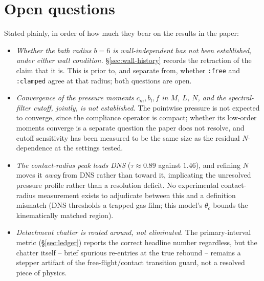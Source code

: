 \section{Open questions}
\label{sec:open}

Stated plainly, in order of how much they bear on the results in the paper:

\begin{itemize}
\item \emph{Whether the bath radius $b=6$ is wall-independent has not been established, under either wall condition.} \S\ref{sec:wall-history} records the retraction of the claim that it is. This is prior to, and separate from, whether \texttt{:free} and \texttt{:clamped} agree at that radius; both questions are open.
\item \emph{Convergence of the pressure moments $c_m,b_l,f$ in $M$, $L$, $N$, and the spectral-filter cutoff, jointly, is not established.} The pointwise pressure is not expected to converge, since the compliance operator is compact; whether its low-order moments converge is a separate question the paper does not resolve, and cutoff sensitivity has been measured to be the same size as the residual $N$-dependence at the settings tested.
\item \emph{The contact-radius peak leads DNS} ($\tau\approx0.89$ against $1.46$), and refining $N$ moves it \emph{away} from DNS rather than toward it, implicating the unresolved pressure profile rather than a resolution deficit. No experimental contact-radius measurement exists to adjudicate between this and a definition mismatch (DNS thresholds a trapped gas film; this model's $\theta_c$ bounds the kinematically matched region).
\item \emph{Detachment chatter is routed around, not eliminated.} The primary-interval metric (\S\ref{sec:ledger}) reports the correct headline number regardless, but the chatter itself -- brief spurious re-entries at the true rebound -- remains a stepper artifact of the free-flight/contact transition guard, not a resolved piece of physics.
\end{itemize}
